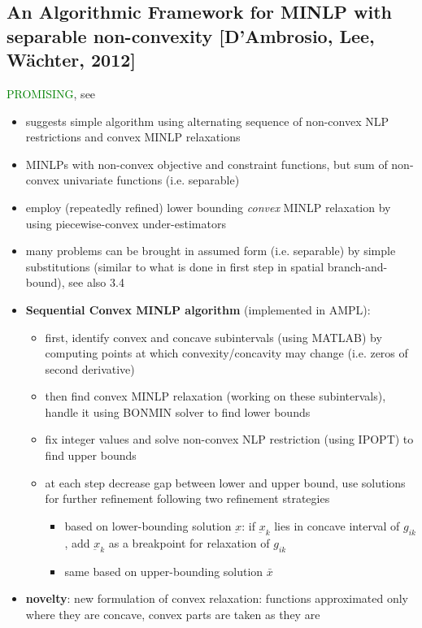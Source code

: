 \documentclass{article}
\begin{document}
\subsection{An Algorithmic Framework for MINLP with separable non-convexity [D'Ambrosio, Lee, W\"achter, 2012]}
\label{sec:SQ-MINLP}
\textcolor{green}{PROMISING}, see \cite{d2012algorithmic}
\begin{itemize}
\item suggests simple algorithm using alternating sequence of non-convex NLP restrictions and convex MINLP relaxations
\item MINLPs with non-convex objective and constraint functions, but sum of non-convex univariate functions (i.e. separable)
\item employ (repeatedly refined) lower bounding \emph{convex} MINLP relaxation by using piecewise-convex under-estimators
\item many problems can be brought in assumed form (i.e. separable) by simple substitutions (similar to what is done in first step in spatial branch-and-bound), see also 3.4
\item \textbf{Sequential Convex MINLP algorithm }(implemented in AMPL):
	\begin{itemize}
	\item first, identify convex and concave subintervals (using MATLAB) by computing points at which convexity/concavity may change (i.e. zeros of second derivative)
	\item then find convex MINLP relaxation (working on these subintervals), handle it using BONMIN solver to find lower bounds
	\item fix integer values and solve non-convex NLP restriction (using IPOPT) to find upper bounds
	\item at each step decrease gap between lower and upper bound, use solutions for further refinement following two refinement strategies
		\begin{itemize}
		\item based on lower-bounding solution $\underbar{x}$: if $\underbar{x}_k$ lies in concave interval of $g_{ik}$, add $\underbar{x}_k$ as a breakpoint for relaxation of $g_{ik}$
		\item same based on upper-bounding solution $\bar{x}$
		\end{itemize}
	\end{itemize}
\item \textbf{novelty}: new formulation of convex relaxation: functions approximated only where they are concave, convex parts are taken as they are

\end{itemize}
\end{document}
